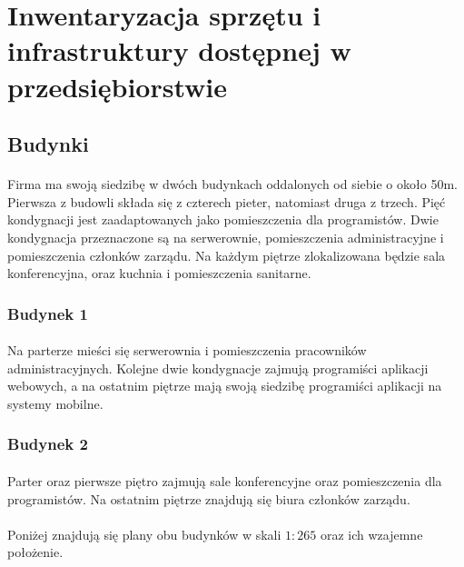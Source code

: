 \section{Inwentaryzacja sprzętu i infrastruktury dostępnej w przedsiębiorstwie}
\subsection{Budynki}
\paragraph{}
Firma ma swoją siedzibę w dwóch budynkach oddalonych od siebie o około 50m. Pierwsza z budowli składa się z czterech pieter, natomiast druga z trzech. Pięć kondygnacji jest zaadaptowanych jako pomieszczenia dla programistów. Dwie kondygnacja przeznaczone są na serwerownie, pomieszczenia administracyjne i  pomieszczenia członków zarządu. Na każdym piętrze zlokalizowana będzie sala konferencyjna, oraz kuchnia i pomieszczenia sanitarne.
\paragraph{}
\subsubsection{Budynek 1}
\paragraph{}
Na parterze mieści się serwerownia i pomieszczenia pracowników administracyjnych. Kolejne dwie kondygnacje zajmują programiści aplikacji webowych, a na ostatnim piętrze mają swoją siedzibę programiści aplikacji na systemy mobilne.

\subsubsection{Budynek 2}
\paragraph{}
Parter oraz pierwsze piętro zajmują sale konferencyjne oraz pomieszczenia dla programistów. Na ostatnim piętrze znajdują się biura członków zarządu.

\paragraph{}
Poniżej znajdują się plany obu budynków w skali $1:265$ oraz ich wzajemne położenie.

